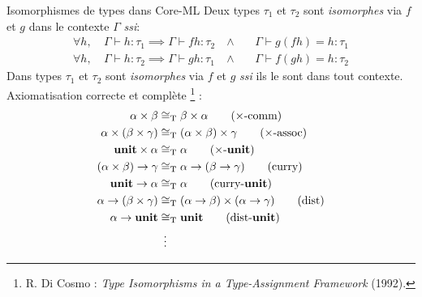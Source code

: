 \documentclass[serif]{beamer}
\newcommand{\ssi}{\textit{ssi}\xspace}
\newcommand{\unit}{\bold{unit}}
\newcommand{\T}{\mathrm{T}}
\begin{document}
\begin{frame}{Isomorphismes de types dans Core-ML}
\small
Deux types $\tau_1$ et $\tau_2$ sont \emph{isomorphes} via $f$ et $g$ dans le contexte $\Gamma$ \ssi :
\begin{align*}
		\forall h,\ &
		\Gamma \vdash h : \tau_1 \implies \Gamma \vdash f h : \tau_2 \ &
		\wedge\ &&
		\Gamma \vdash g (f h) = h : \tau_1
	\\
		\forall h,\ &
		\Gamma \vdash h : \tau_2 \implies \Gamma \vdash g h : \tau_1 \ &
		\wedge\ &&
		\Gamma \vdash f (g h) = h : \tau_2
\end{align*}
Dans types $\tau_1$ et $\tau_2$ sont \emph{isomorphes} via $f$ et $g$ \ssi ils le sont dans tout contexte. \\
Axiomatisation correcte et complète \footnote{R. Di Cosmo : \textit{Type Isomorphisms in a Type-Assignment Framework} (1992).} :
\begin{align*}
		\alpha \times \beta &\cong_\T
		\beta \times \alpha
		\label{prod_comm}
		\tag{$\times$-comm}
	\\
		\alpha \times (\beta \times \gamma) &\cong_\T
		(\alpha \times \beta) \times \gamma
		\label{prod_assoc}
		\tag{$\times$-assoc}
	\\
		\unit \times \alpha &\cong_\T
		\alpha
		\label{prod_unit}
		\tag{$\times$-$\unit$}
	\\
		(\alpha \times \beta) \rightarrow \gamma &\cong_\T
		\alpha \rightarrow (\beta \rightarrow \gamma)
		\label{curry}
		\tag{curry}
	\\
		\unit \rightarrow \alpha &\cong_\T
		\alpha
		\label{curry_unit}
		\tag{curry-$\unit$}
	\\
		\alpha \rightarrow (\beta \times \gamma) &\cong_\T
		(\alpha \rightarrow \beta) \times (\alpha \rightarrow \gamma)
		\label{dist}
		\tag{dist}
	\\
		\alpha \rightarrow \unit &\cong_\T
		\unit
		\label{dist_unit}
		\tag{dist-$\unit$}
	\\
		&\ \,\vdots
\end{align*}
\end{frame}

\end{document}
